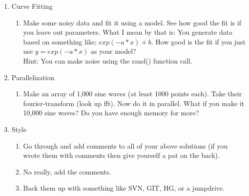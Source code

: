 \begin{enumerate}
 \item Curve Fitting
  \begin{enumerate}
   \item Make some noisy data and fit it using a model. See how good the fit is if you leave out parameters. What I mean by that is: You generate data based on something like; $exp(-a*x) + b$. How good is the fit if you just use $y = exp(-a*x)$ as your model? \\
Hint: You can make noise using the rand() function call.
  \end{enumerate}

 \item Parallelization
  \begin{enumerate}
   \item Make an array of 1,000 sine waves (at least 1000 points each). Take their fourier-transform (look up fft). Now do it in parallel. What if you make it 10,000 sine waves? Do you have enough memory for more?
  \end{enumerate}

 \item Style
  \begin{enumerate}
   \item Go through and add comments to all of your above solutions (if you wrote them with comments then give yourself a pat on the back).
   \item No really, add the comments.
   \item Back them up with something like SVN, GIT, HG, or a jumpdrive.
  \end{enumerate}
\end{enumerate}
